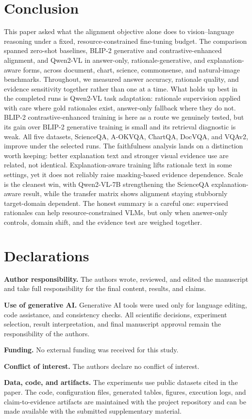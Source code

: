 \documentclass[preprint,12pt]{elsarticle}
\begin{document}
\section{Conclusion}
This paper asked what the alignment objective alone does to vision--language reasoning under a fixed, resource-constrained fine-tuning budget.
The comparison spanned zero-shot baselines, BLIP-2 generative and contrastive-enhanced alignment, and Qwen2-VL in answer-only, rationale-generative, and explanation-aware forms, across document, chart, science, commonsense, and natural-image benchmarks.
Throughout, we measured answer accuracy, rationale quality, and evidence sensitivity together rather than one at a time.
What holds up best in the completed runs is Qwen2-VL task adaptation: rationale supervision applied with care where gold rationales exist, answer-only fallback where they do not.
BLIP-2 contrastive-enhanced training is here as a route we genuinely tested, but its gain over BLIP-2 generative training is small and its retrieval diagnostic is weak.
All five datasets, ScienceQA, A-OKVQA, ChartQA, DocVQA, and VQAv2, improve under the selected runs.
The faithfulness analysis lands on a distinction worth keeping: better explanation text and stronger visual evidence use are related, not identical.
Explanation-aware training lifts rationale text in some settings, yet it does not reliably raise masking-based evidence dependence.
Scale is the cleanest win, with Qwen2-VL-7B strengthening the ScienceQA explanation-aware result, while the transfer matrix shows alignment staying stubbornly target-domain dependent.
The honest summary is a careful one: supervised rationales can help resource-constrained VLMs, but only when answer-only controls, domain shift, and the evidence test are weighed together.

\section*{Declarations}
\textbf{Author responsibility.}
The authors wrote, reviewed, and edited the manuscript and take full responsibility for the final content, results, and claims.

\textbf{Use of generative AI.}
Generative AI tools were used only for language editing, code assistance, and consistency checks.
All scientific decisions, experiment selection, result interpretation, and final manuscript approval remain the responsibility of the authors.

\textbf{Funding.}
No external funding was received for this study.

\textbf{Conflict of interest.}
The authors declare no conflict of interest.

\textbf{Data, code, and artifacts.}
The experiments use public datasets cited in the paper.
The code, configuration files, generated tables, figures, execution logs, and claim-to-evidence artifacts are maintained with the project repository and can be made available with the submitted supplementary material.



\end{document}
